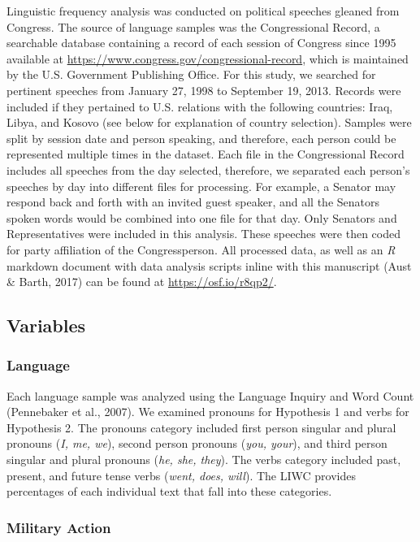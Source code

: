 \documentclass[english,man]{apa6}
\theoremstyle{definition}
\theoremstyle{definition}
\theoremstyle{definition}
\theoremstyle{remark}
\begin{document}
Linguistic frequency analysis was conducted on political speeches
gleaned from Congress. The source of language samples was the
Congressional Record, a searchable database containing a record of each
session of Congress since 1995 available at
\url{https://www.congress.gov/congressional-record}, which is maintained
by the U.S. Government Publishing Office. For this study, we searched
for pertinent speeches from January 27, 1998 to September 19, 2013.
Records were included if they pertained to U.S. relations with the
following countries: Iraq, Libya, and Kosovo (see below for explanation
of country selection). Samples were split by session date and person
speaking, and therefore, each person could be represented multiple times
in the dataset. Each file in the Congressional Record includes all
speeches from the day selected, therefore, we separated each person's
speeches by day into different files for processing. For example, a
Senator may respond back and forth with an invited guest speaker, and
all the Senators spoken words would be combined into one file for that
day. Only Senators and Representatives were included in this analysis.
These speeches were then coded for party affiliation of the
Congressperson. All processed data, as well as an \emph{R} markdown
document with data analysis scripts inline with this manuscript (Aust \&
Barth, 2017) can be found at \url{https://osf.io/r8qp2/}.

\subsection{Variables}\label{variables}

\subsubsection{Language}\label{language}

Each language sample was analyzed using the Language Inquiry and Word
Count (Pennebaker et al., 2007). We examined pronouns for Hypothesis 1
and verbs for Hypothesis 2. The pronouns category included first person
singular and plural pronouns (\emph{I, me, we}), second person pronouns
(\emph{you, your}), and third person singular and plural pronouns
(\emph{he, she, they}). The verbs category included past, present, and
future tense verbs (\emph{went, does, will}). The LIWC provides
percentages of each individual text that fall into these categories.

\subsubsection{Military Action}\label{military-action}
\end{document}
